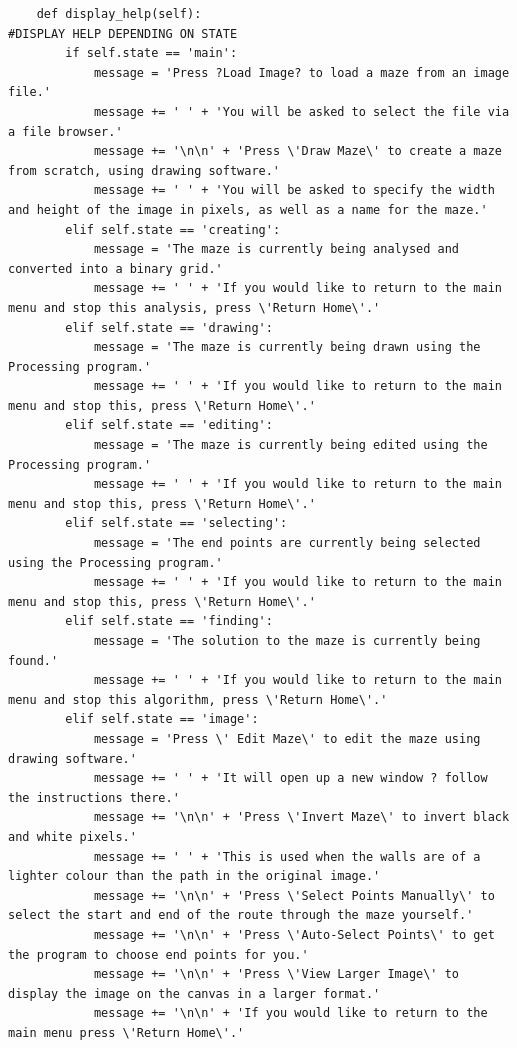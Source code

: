 \documentclass[titlepage]{article}
\begin{document}
\begin{changemargin}{-1in}{-1in}
\begin{verbatim}
    def display_help(self):                                                     #DISPLAY HELP DEPENDING ON STATE
        if self.state == 'main':
            message = 'Press ?Load Image? to load a maze from an image file.'
            message += ' ' + 'You will be asked to select the file via a file browser.'
            message += '\n\n' + 'Press \'Draw Maze\' to create a maze from scratch, using drawing software.'
            message += ' ' + 'You will be asked to specify the width and height of the image in pixels, as well as a name for the maze.'
        elif self.state == 'creating':
            message = 'The maze is currently being analysed and converted into a binary grid.'
            message += ' ' + 'If you would like to return to the main menu and stop this analysis, press \'Return Home\'.'
        elif self.state == 'drawing':
            message = 'The maze is currently being drawn using the Processing program.'
            message += ' ' + 'If you would like to return to the main menu and stop this, press \'Return Home\'.'
        elif self.state == 'editing':
            message = 'The maze is currently being edited using the Processing program.'
            message += ' ' + 'If you would like to return to the main menu and stop this, press \'Return Home\'.'
        elif self.state == 'selecting':
            message = 'The end points are currently being selected using the Processing program.'
            message += ' ' + 'If you would like to return to the main menu and stop this, press \'Return Home\'.'
        elif self.state == 'finding':
            message = 'The solution to the maze is currently being found.'
            message += ' ' + 'If you would like to return to the main menu and stop this algorithm, press \'Return Home\'.'
        elif self.state == 'image':
            message = 'Press \' Edit Maze\' to edit the maze using drawing software.'
            message += ' ' + 'It will open up a new window ? follow the instructions there.'
            message += '\n\n' + 'Press \'Invert Maze\' to invert black and white pixels.'
            message += ' ' + 'This is used when the walls are of a lighter colour than the path in the original image.'
            message += '\n\n' + 'Press \'Select Points Manually\' to select the start and end of the route through the maze yourself.'
            message += '\n\n' + 'Press \'Auto-Select Points\' to get the program to choose end points for you.'
            message += '\n\n' + 'Press \'View Larger Image\' to display the image on the canvas in a larger format.'
            message += '\n\n' + 'If you would like to return to the main menu press \'Return Home\'.'

\end{verbatim}
\end{changemargin}
\end{document}
